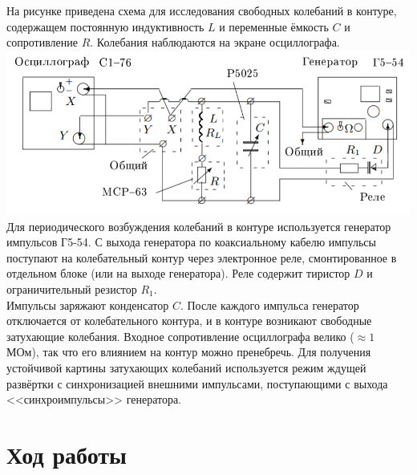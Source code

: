 \documentclass[11pt]{article}
\begin{document}
На рисунке приведена схема для исследования свободных колебаний в контуре, содержащем постоянную индуктивность $L$ и переменные ёмкость $C$ и сопротивление $R$. Колебания наблюдаются на экране осциллографа.\\
\includegraphics[width=14cm]{g2}\\
Для периодического возбуждения колебаний в контуре используется генератор импульсов Г5-54. С выхода генератора по коаксиальному кабелю импульсы поступают на колебательный контур через электронное реле, смонтированное в отдельном блоке (или на выходе генератора). Реле содержит тиристор $D$ и ограничительный резистор $R_1$.\\
Импульсы заряжают конденсатор $C$. После каждого импульса генератор отключается от колебательного контура, и в контуре возникают свободные затухающие колебания. Входное сопротивление осциллографа велико ($\approx 1$ МОм), так что его влиянием на контур можно пренебречь. Для получения устойчивой картины затухающих колебаний используется режим ждущей развёртки с синхронизацией внешними импульсами, поступающими с выхода <<синхроимпульсы>> генератора.
\section{Ход работы}
\end{document}
